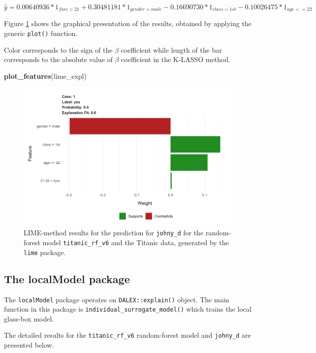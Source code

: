 \documentclass[]{krantz}
\newenvironment{Shaded}{\begin{snugshade}}{\end{snugshade}}
\newcommand{\KeywordTok}[1]{\textcolor[rgb]{0.13,0.29,0.53}{\textbf{#1}}}
\newcommand{\NormalTok}[1]{#1}
\begin{document}
\[
\hat y = 0.00640936 * 1_{fare > 21} + 0.30481181 * 1_{gender = male} - 
0.16690730 * 1_{class = 1st} -0.10026475 * 1_{age <= 22}
\]

Figure \ref{fig:limeExplLIMETitanic} shows the graphical presentation of the results, obtained by applying the generic \texttt{plot()} function.

Color corresponds to the sign of the \(\beta\) coefficient while length of the bar corresponds to the absolute value of \(\beta\) coefficient in the K-LASSO method.

\begin{Shaded}
\begin{Highlighting}[]
\KeywordTok{plot_features}\NormalTok{(lime_expl)}
\end{Highlighting}
\end{Shaded}



\begin{figure}

{\centering \includegraphics[width=0.6\linewidth]{figure/lime_expl_lime_titanic} 

}

\caption{LIME-method results for the prediction for \texttt{johny\_d} for the random-forest model \texttt{titanic\_rf\_v6} and the Titanic data, generated by the \texttt{lime} package.}\label{fig:limeExplLIMETitanic}
\end{figure}

\hypertarget{the-localmodel-package}{%
\subsection{The localModel package}\label{the-localmodel-package}}

The \texttt{localModel} package operates on \texttt{DALEX::explain()} object. The main function in this package is \texttt{individual\_surrogate\_model()} which trains the local glass-box model.

The detailed results for the \texttt{titanic\_rf\_v6} random-forest model and \texttt{johny\_d} are presented below.
\end{document}
